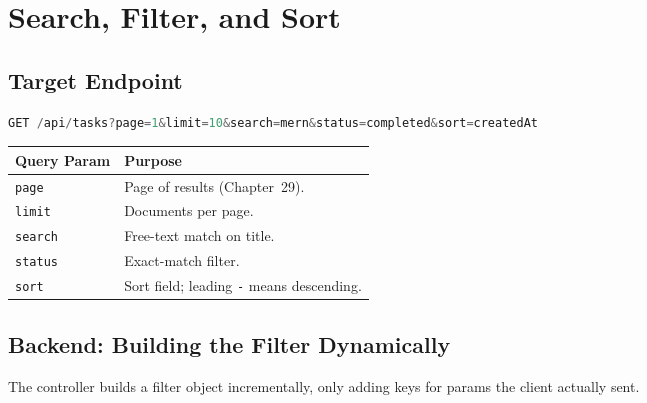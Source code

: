 \chapter{Search, Filter, and Sort}

\section{Target Endpoint}

\begin{lstlisting}[language=JavaScript]
GET /api/tasks?page=1&limit=10&search=mern&status=completed&sort=createdAt
\end{lstlisting}

\begin{table}[h]
\centering
\begin{tabularx}{\textwidth}{l X}
\toprule
\textbf{Query Param} & \textbf{Purpose} \\
\midrule
\texttt{page} & Page of results (Chapter~29). \\
\texttt{limit} & Documents per page. \\
\texttt{search} & Free-text match on title. \\
\texttt{status} & Exact-match filter. \\
\texttt{sort} & Sort field; leading \texttt{-} means descending. \\
\bottomrule
\end{tabularx}
\end{table}

\section{Backend: Building the Filter Dynamically}

The controller builds a filter object incrementally, only adding keys for
params the client actually sent.

